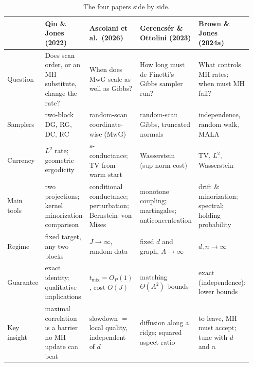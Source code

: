 \documentclass[11pt]{article}
\theoremstyle{remark}
\newcommand{\tmix}{t_{\mathrm{mix}}}
\begin{document}
\begin{table}[t]
\centering\footnotesize
\renewcommand{\arraystretch}{1.18}
\begin{tabularx}{\textwidth}{@{}L{1.6cm}YYYY@{}}
\toprule
 & \textbf{Qin \& Jones (2022)} & \textbf{Ascolani et al.\ (2026)} & \textbf{Gerencs\'er \& Ottolini (2023)} & \textbf{Brown \& Jones (2024a)} \\
\midrule
Question & Does scan order, or an MH substitute, change the rate? & When does MwG scale as well as Gibbs? & How long must de Finetti's Gibbs sampler run? & What controls MH rates; when must MH fail? \\
Samplers & two-block DG, RG, DC, RC & random-scan coordinate-wise (MwG) & random-scan Gibbs, truncated normals & independence, random walk, MALA \\
Currency & $L^2$ rate; geometric ergodicity & $s$-conductance; TV from warm start & Wasserstein (sup-norm cost) & TV, $L^2$, Wasserstein \\
Main tools & two projections; kernel minorization comparison & conditional conductance; perturbation; Bernstein--von Mises & monotone coupling; martingales; anticoncentration & drift \& minorization; spectral; holding probability \\
Regime & fixed target, any two blocks & $J\to\infty$, random data & fixed $d$ and graph, $A\to\infty$ & $d,n\to\infty$ \\
Guarantee & exact identity; qualitative implications & $\tmix=O_P(1)$, cost $O(J)$ & matching $\Theta(A^2)$ bounds & exact (independence); lower bounds \\
Key insight & maximal correlation is a barrier no MH update can beat & slowdown $=$ local quality, independent of $d$ & diffusion along a ridge; squared aspect ratio & to leave, MH must accept; tune with $d$ and $n$ \\
\bottomrule
\end{tabularx}
\caption{The four papers side by side.}
\label{tab:compare}
\end{table}

\end{document}
